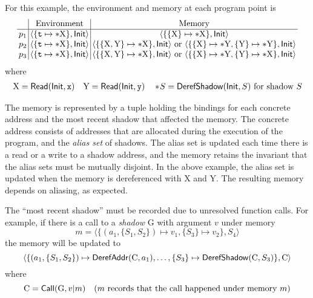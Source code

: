 \documentclass{article}
\begin{document}
For this example, the environment and memory at each program point is
\[
  \setlength{\arraycolsep}{2pt}
  \begin{array}{c|c|c}
              & \text{Environment}                                  & \text{Memory}                                                                                                                                               \\
    \hline
    \ppoint_1 & \langle\{\texttt{t}\mapsto*\text{X}\},\InitE\rangle & \langle\{\{\text{X}\}\mapsto*\text{X}\},\InitE\rangle                                                                                                       \\
    \ppoint_2 & \langle\{\texttt{t}\mapsto*\text{X}\},\InitE\rangle & \langle\{\{\text{X},\text{Y}\}\mapsto*\text{X}\},\InitE\rangle\text{ or }\langle\{\{\text{X}\}\mapsto*\text{Y},\{\text{Y}\}\mapsto*\text{Y}\},\InitE\rangle \\
    \ppoint_3 & \langle\{\texttt{t}\mapsto*\text{X}\},\InitE\rangle & \langle\{\{\text{X},\text{Y}\}\mapsto*\text{X}\},\InitE\rangle\text{ or }\langle\{\{\text{X}\}\mapsto*\text{Y},\{\text{Y}\}\mapsto*\text{X}\},\InitE\rangle
  \end{array}
\]
where
\begin{align*}
  \text{X}=\mathsf{Read}(\mathsf{Init},\texttt{x})\quad\text{Y}=\mathsf{Read}(\mathsf{Init},\texttt{y})\quad*\!S=\mathsf{DerefShadow}(\mathsf{Init},S)\text{ for shadow }S
\end{align*}

The memory is represented by a tuple holding the bindings for each concrete address
and the most recent shadow that affected the memory.
The concrete address consists of addresses that are allocated during the execution
of the program, and the \emph{alias set} of shadows.
The alias set is updated each time there is a read or a write to a shadow address,
and the memory retains the invariant that the alias sets must be mutually disjoint.
In the above example, the alias set is updated when the memory is dereferenced with
X and Y. The resulting memory depends on aliasing, as expected.

The ``most recent shadow'' must be recorded due to unresolved function calls.
For example, if there is a call to a \emph{shadow} G with argument $v$ under memory
\[m=\langle\{(a_1,\{S_1,S_2\})\mapsto v_1,\{S_3\}\mapsto v_2\},S_4\rangle\]
the memory will be updated to
\[\langle\{(a_1,\{S_1,S_2\})\mapsto\mathsf{DerefAddr}(\text{C},a_1),\dots,\{S_3\}\mapsto\mathsf{DerefShadow}(\text{C},S_3)\},\text{C}\rangle\]
where
\[\text{C}=\mathsf{Call}(\text{G},v|m)\quad(m\text{ records that the call happened under memory }m)\]
\end{document}
